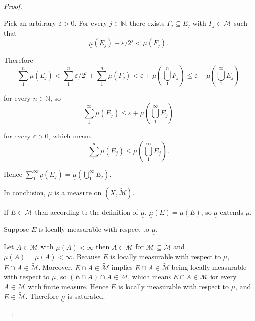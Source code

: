 \begin{proof}
\begin{enumerate}[itemsep=0pt,label=\textbf{\alph*.}]
              Pick an arbitrary \( \varepsilon > 0 \). For every \( j \in \mathbb{N} \), there exists \( F_{j} \subseteq E_{j} \) with \( F_{j} \in \mathcal{M} \) such that
              \[
                  \underline{\mu}(E_{j}) - \varepsilon/2^{j} < \mu(F_{j}).
              \]

              Therefore
              \[
                  \sum_{1}^{n} \underline{\mu}(E_{j}) < \sum_{1}^{n}\varepsilon/2^{j} + \sum_{1}^{n} \mu(F_{j}) < \varepsilon + \mu\left( \bigcup_{1}^{n} F_{j} \right) \le \varepsilon + \underline{\mu}\left(\bigcup_{1}^{\infty} E_{j}\right)
              \]

              for every \( n \in \mathbb{N} \), so
              \[
                  \sum_{1}^{\infty} \underline{\mu}(E_{j}) \le \varepsilon + \underline{\mu}\left( \bigcup_{1}^{\infty} E_{j} \right)
              \]

              for every \( \varepsilon > 0 \), which means
              \[
                  \sum_{1}^{\infty} \underline{\mu}(E_{j}) \le \underline{\mu}\left( \bigcup_{1}^{\infty} E_{j} \right).
              \]

              Hence \( \sum_{1}^{\infty} \underline{\mu}(E_{j}) = \underline{\mu}\left( \bigcup_{1}^{\infty} E_{j} \right) \).

              In conclusion, \( \underline{\mu} \) is a measure on \( (X, \widetilde{\mathcal{M}}) \).

              \bigskip

              If \( E \in \mathcal{M} \) then according to the definition of \( \underline{\mu} \), \( \underline{\mu}(E) = \mu(E) \), so \( \underline{\mu} \) extends \( \mu \).

              \bigskip

              Suppose \( E \) is locally measurable with respect to \( \underline{\mu} \).

              Let \( A \in \mathcal{M} \) with \( \mu(A) < \infty \) then \( A \in \widetilde{\mathcal{M}} \) for \( \mathcal{M} \subseteq \widetilde{\mathcal{M}} \) and \( \underline{\mu}(A) = \mu(A) < \infty \). Because \( E \) is locally measurable with respect to \( \underline{\mu} \), \( E \cap A \in \widetilde{\mathcal{M}} \). Moreover,  \( E \cap A \in \widetilde{\mathcal{M}} \) implies  \( E \cap A \in \widetilde{\mathcal{M}} \) being locally measurable with respect to \( \mu \), so \( (E \cap A) \cap A \in \mathcal{M} \), which means \( E \cap A \in \mathcal{M} \) for every \( A \in \mathcal{M} \) with finite measure. Hence \( E \) is locally measurable with respect to \( \mu \), and \( E \in \widetilde{\mathcal{M}} \). Therefore \( \underline{\mu} \) is saturated.


\end{enumerate}
\end{proof}
